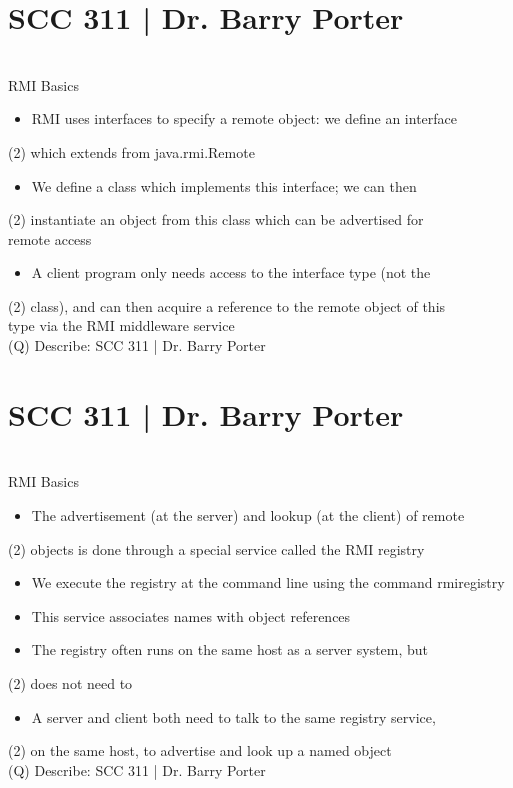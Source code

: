 \documentclass[12pt]{article}
\begin{document}
\section{SCC 311 | Dr. Barry Porter}
\\
RMI Basics\\
\begin{itemize}
  \item RMI uses interfaces to specify a remote object: we define an interface 
\end{itemize}(2)
which extends from java.rmi.Remote\\
\begin{itemize}
  \item We define a class which implements this interface; we can then 
\end{itemize}(2)
instantiate an object from this class which can be advertised for \\
remote access\\
\begin{itemize}
  \item A client program only needs access to the interface type (not the 
\end{itemize}(2)
class), and can then acquire a reference to the remote object of this \\
type via the RMI middleware service\\
\clearpage
(Q)
Describe: SCC 311 | Dr. Barry Porter
\clearpage
\section{SCC 311 | Dr. Barry Porter}
\\
RMI Basics\\
\begin{itemize}
  \item The advertisement (at the server) and lookup (at the client) of remote 
\end{itemize}(2)
objects is done through a special service called the RMI registry\\
\begin{itemize}
  \item We execute the registry at the command line using the command rmiregistry
  \item This service associates names with object references
  \item The registry often runs on the same host as a server system, but 
\end{itemize}(2)
does not need to\\
\begin{itemize}
  \item A server and client both need to talk to the same registry service, 
\end{itemize}(2)
on the same host, to advertise and look up a named object\\
\clearpage
(Q)
Describe: SCC 311 | Dr. Barry Porter
\clearpage
\end{document}
